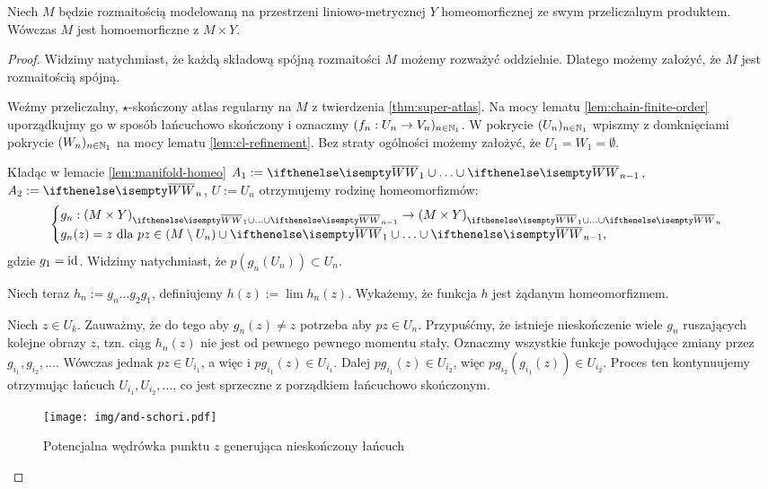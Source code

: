 \begin{thm}
  Niech $M$ będzie rozmaitością modelowaną na przestrzeni liniowo-metrycznej $Y$ homeomorficznej ze swym przeliczalnym produktem. Wówczas $M$ jest homoemorficzne z $M\times Y$.
  
  \begin{proof}
    Widzimy natychmiast, że każdą składową spójną rozmaitości $M$ możemy rozważyć oddzielnie. Dlatego możemy założyć, że $M$ jest rozmaitością spójną.
  
    Weźmy przeliczalny, $\star$-skończony atlas regularny na $M$ z twierdzenia \ref{thm:super-atlas}. Na mocy lematu \ref{lem:chain-finite-order} uporządkujmy go w sposób łańcuchowo skończony i oznaczmy $(f_n: U_n \to V_n)_{n\in{\mathbb{N}_1}}$. W pokrycie $(U_n)_{n\in{\mathbb{N}_1}}$ wpiszmy z domknięciami pokrycie $(W_n)_{n\in{\mathbb{N}_1}}$ na mocy lematu \ref{lem:cl-refinement}. Bez straty ogólności możemy założyć, że $U_1 = W_1 = \emptyset$.
    
    Kładąc w lemacie \ref{lem:manifold-homeo} $A_1 := \cl W_1 \cup\ldots\cup \cl W_{n-1}$, $A_2 := \cl W_{n}$, $U := U_n$ otrzymujemy rodzinę homeomorfizmów:
    \[
      \begin{cases}
        g_n: (M\times Y)_{\cl W_1 \cup\ldots\cup \cl W_{n-1}} \to (M\times Y)_{\cl W_1 \cup\ldots\cup \cl W_n}& \\
        g_n(z) = z\mbox{ dla }pz\in (M\setminus U_n)\cup \cl W_1 \cup\ldots\cup \cl W_{n-1},
      \end{cases}
    \]
    gdzie $g_1 = \operatorname{id}$. Widzimy natychmiast, że $p(g_n(U_n)) \subset U_n$.
    
    Niech teraz $h_n := g_n \ldots g_2 g_1$, definiujemy $h(z) := \lim h_n(z)$. Wykażemy, że funkcja $h$ jest żądanym homeomorfizmem.
    
    Niech $z \in U_k$. Zauważmy, że do tego aby $g_n(z) \neq z$ potrzeba aby $pz \in U_n$. Przypuśćmy, że istnieje nieskończenie wiele $g_n$ ruszających kolejne obrazy $z$, tzn. ciąg $h_n(z)$ nie jest od pewnego pewnego momentu stały. Oznaczmy wszystkie funkcje powodujące zmiany przez $g_{i_1}, g_{i_2}, \dots$. Wówczas jednak $pz \in U_{i_1}$, a więc i $p g_{i_1}(z) \in U_{i_1}$. Dalej $p g_{i_1}(z) \in U_{i_2}$, więc $p g_{i_2}(g_{i_1}(z)) \in U_{i_2}$. Proces ten kontynuujemy otrzymując łańcuch $U_{i_1}, U_{i_2}, \dots$, co jest sprzeczne z porządkiem łańcuchowo skończonym.
    
    \begin{figure}[h!]
      \centering
      \texttt{[image: img/and-schori.pdf]}
      \caption{Potencjalna wędrówka punktu $z$ generująca nieskończony łańcuch}
    \end{figure}
    

\end{proof}
\end{thm}
